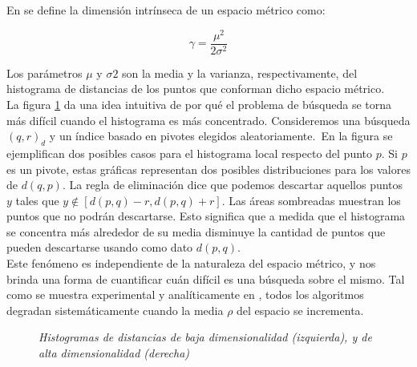 \noindent En \cite{oursurvey} se define la dimensi\'on intr\'inseca de un espacio m\'etrico como:

\[
\gamma = \frac{\mu^2}{2\sigma^2}
\]

Los par\'ametros $\mu$ y $\sigma 2$ son la media y la varianza, respectivamente, del histograma de distancias de los puntos que conforman dicho espacio m\'etrico.\\

La figura \ref{dim1} da una idea intuitiva de por qu\'e el problema de b\'usqueda se torna m\'as dif\'icil cuando el histograma es m\'as concentrado. Consideremos una b\'usqueda $(q,r)_{d}$ y un \'indice
basado en pivotes elegidos aleatoriamente.\
En la figura se ejemplifican dos posibles casos para el histograma local respecto del punto $p$. Si $p$ es un pivote, estas gr\'aficas representan dos posibles distribuciones para los valores de $d(q,p)$. La regla de eliminaci\'on dice que podemos descartar aquellos puntos $y$ tales que  $y \notin [d(p,q)-r, d(p,q) + r]$. Las \'areas sombreadas muestran  los puntos que no podr\'an descartarse. Esto significa que a medida que el histograma se concentra m\'as alrededor de su media disminuye la cantidad de puntos que pueden descartarse usando como dato $d(p,q)$.\\

Este fen\'omeno es independiente de la naturaleza del espacio m\'etrico,  y nos brinda una forma de cuantificar cu\'an dif\'icil es una b\'usqueda sobre el mismo. Tal como se muestra experimental y anal\'iticamente en \cite{oursurvey}, todos los algoritmos degradan  sistem\'aticamente cuando la media $\rho$ del espacio se incrementa.\\

\begin{figure}[tb]
\centerline{%
  }
  \caption [Histogramas de distancias de baja y
             alta dimensionalidad]
    { \textsl{\footnotesize Histogramas de distancias de baja dimensionalidad
                (izquierda), y  de alta dimensionalidad (derecha)}}
\label{dim1}
\end{figure}

